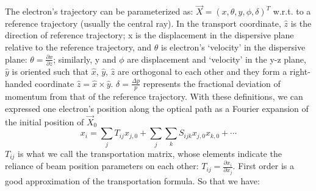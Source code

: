 The electron's trajectory can be parameterized as: $\vec{X} = (x, \theta, y, \phi, \delta)^T$ 
w.r.t. to a reference trajectory (usually the central ray). In the transport coordinate, 
$\hat{z}$ is the direction of reference trajectory;
x is the displacement in the dispersive plane relative to the reference 
trajectory, and $\theta$ is electron's `velocity' in the dispersive plane:
$\theta = \frac{\partial x}{\partial z}$; similarly, y and $\phi$ are displacement
and `velocity' in the y-z plane, $\hat{y}$ is oriented such that $\hat{x}$, 
$\hat{y}$, $\hat{z}$ are orthogonal to each other and they form a 
right-handed coordinate $\hat{z} = \hat{x} \times \hat{y}$.
$\delta = \frac{\Delta p}{p}$ represents the fractional deviation of momentum
from that of the reference trajectory. With these definitions, we can expressed
one electron's position along the optical path as a Fourier expansion of the
initial position of $\vec{X}_0$
\begin{equation}
    x_i = \sum_j T_{ij} x_{j,0} + \sum_j \sum_k S_{ijk} x_{j,0}x_{k, 0} + \cdots
\end{equation}
$T_{ij}$ is what we call the transportation matrix, whose elements indicate
the reliance of beam position parameters on each other: $T_{ij} = \frac{\partial x_i}{\partial x_j}$.
First order is a good approximation of the transportation formula. So that we
have:
